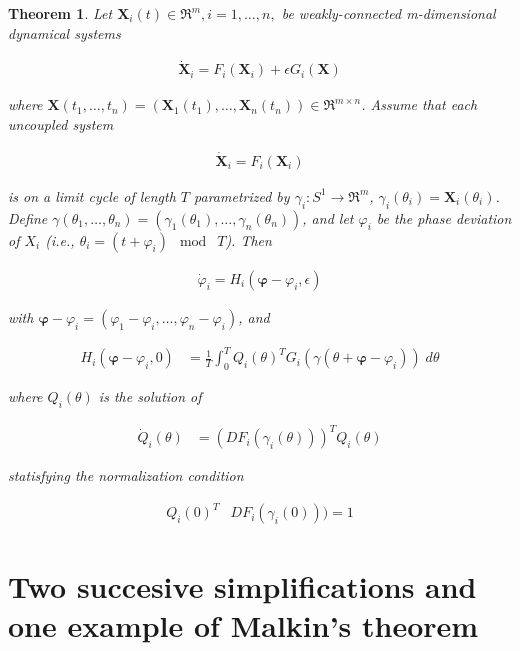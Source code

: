 \documentclass{article}
\newtheorem{malkinsTheorem}{Theorem}
\begin{document}
\begin{malkinsTheorem}

Let $\bm{X}_i(t)\in\Re^m, i=1, \ldots, n,$ be weakly-connected m-dimensional dynamical
systems

\begin{align}
\dot{\bm{X}}_i=F_i(\bm{X}_i)+\epsilon G_i(\bm{X})
\label{eq:xiDot}
\end{align}

\noindent where
$\bm{X}(t_1,\ldots,t_n)=(\bm{X}_1(t_1),\ldots,\bm{X}_n(t_n))\in\Re^{m\times n}$. Assume that
each uncoupled system

\begin{align}
\dot{\bm{X}}_i=F_i(\bm{X}_i)
\end{align}

\noindent is on a limit cycle of length $T$ parametrized by
$\gamma_i: S^1\rightarrow \Re^m$, $\gamma_i(\theta_i)=\bm{X}_i(\theta_i)$.
Define
$\gamma(\theta_1,\ldots,\theta_n)=(\gamma_1(\theta_1),\ldots,\gamma_n(\theta_n))$,
and let $\varphi_i$ be the phase deviation of $X_i$ (i.e.,
$\theta_i=(t+\varphi_i)\;\bmod\;T$). Then

\begin{align}
\dot{\varphi}_i=H_i(\bm{\varphi}-\varphi_i,\epsilon)
\label{eq:phiiDot}
\end{align}

\noindent with
$\bm{\varphi}-\varphi_i=(\varphi_1-\varphi_i,\ldots,\varphi_n-\varphi_i)$, and

\begin{align}
H_i(\bm{\varphi}-\varphi_i,0)&=\frac{1}{T}\int_{0}^{T}Q_i(\theta)^TG_i(\gamma(\theta+\bm{\varphi}-\varphi_i))\;d\theta
\label{eq:Hi}
\end{align}

\noindent where $Q_i(\theta)$ is the solution of

\begin{align}
\dot{Q}_i(\theta)&=(DF_i(\gamma_i(\theta)))^TQ_i(\theta)
\end{align}

\noindent statisfying the normalization condition

\begin{align}
Q_i(0)^T&DF_i(\gamma_i(0)))=1
\end{align}

\end{malkinsTheorem}

\section{Two succesive simplifications and one example of Malkin's theorem}
\label{sec:malkinsTheormeSimplificationsAndExample}
\end{document}
